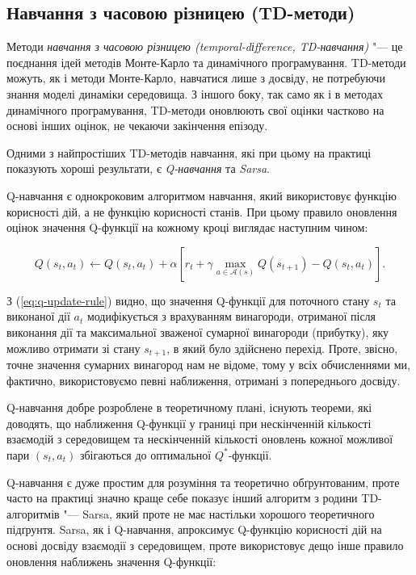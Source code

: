 \documentclass[a4paper,10pt,fleqn]{article}
\begin{document}
\subsection{Навчання з часовою різницею (TD-методи)}

Методи \emph{навчання з часовою різницею (temporal-dіfference, TD-навчання)} "--- це поєднання ідей методів Монте-Карло та динамічного програмування. TD-методи можуть, як і методи Монте-Карло, навчатися лише з досвіду, не потребуючи знання моделі динаміки середовища. З іншого боку, так само як і в методах динамічного програмування, TD-методи оновлюють свої оцінки частково на основі інших оцінок, не чекаючи закінчення епізоду.

Одними з найпростіших TD-методів навчання, які при цьому на практиці показують хороші результати, є \emph{Q-навчання} та \emph{Sarsa}.

Q-навчання є однокроковим алгоритмом навчання, який використовує функцію корисності дій, а не функцію корисності станів. При цьому правило оновлення оцінок значення Q-функції на кожному кроці виглядає наступним чином:

\begin{equation}
Q(s_t,a_t) \leftarrow Q(s_t, a_t) + \alpha \left[ r_t + \gamma \max_{a \in \mathcal{A}(s)} Q(s_{t+1}) - Q(s_t,a_t) \right].
\label{eq:q-update-rule}
\end{equation}

З (\ref{eq:q-update-rule}) видно, що значення Q-функції для поточного стану $s_t$ та виконаної дії $a_t$ модифікується з врахуванням винагороди, отриманої після виконання дії та максимальної зваженої сумарної винагороди (прибутку), яку можливо отримати зі стану $s_{t+1}$, в який було здійснено перехід. Проте, звісно, точне значення сумарних винагород нам не відоме, тому у всіх обчисленнями ми, фактично, використовуємо певні наближення, отримані з попереднього досвіду. 

Q-навчання добре розроблене в теоретичному плані, існують теореми, які доводять, що наближення Q-функції у границі при нескінченній кількості взаємодій з середовищем та нескінченній кількості оновлень кожної можливої пари $(s_t,a_t)$ збігаються до оптимальної $Q^*$-функції. 

Q-навчання є дуже простим для розуміння та теоретично обґрунтованим, проте часто на практиці значно краще себе показує інший алгоритм з родини TD-алгоритмів "--- Sarsa, який проте не має настільки хорошого теоретичного підґрунтя.  Sarsa, як і Q-навчання, апроксимує Q-функцію корисності дій на основі досвіду взаємодії з середовищем, проте використовує дещо інше правило оновлення наближень значення Q-функції:
\end{document}
